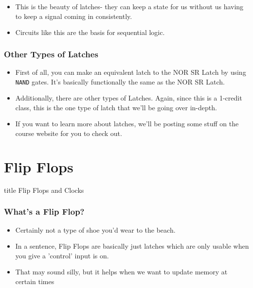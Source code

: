 \documentclass{beamer}
\begin{document}
\begin{frame}
{\begin{tikzpicture}[x=0.75pt,y=0.75pt,yscale=-1,xscale=1]
\end{tikzpicture}

   			}
   			
   			\begin{itemize}
   				\item This is the beauty of latches- they can keep a state for us without us having to keep a signal coming in consistently.
   				\item Circuits like this are the basis for sequential logic.
   			\end{itemize}
   			
   			
   		\end{frame}
   		
   		\begin{frame}
   			\frametitle{Other Types of Latches}
   			\begin{itemize}
   				\item First of all, you can make an equivalent latch to the NOR SR Latch by using \texttt{NAND} gates. It's basically functionally the same as the NOR SR Latch.
   				\item Additionally, there are other types of Latches. Again, since this is a 1-credit class, this is the one type of latch that we'll be going over in-depth.
   				\item If you want to learn more about latches, we'll be posting some stuff on the course website for you to check out.
   			\end{itemize}
   		\end{frame}
   		
   	\section{Flip Flops}
   	
   	\begin{frame}
                \vfill
                \centering
                \begin{beamercolorbox}[sep=8pt,center,shadow=true,rounded=true]{title}
                    Flip Flops and Clocks\par%
                \end{beamercolorbox}
                \vfill
             \end{frame}
   	
   		\begin{frame}
   			\frametitle{What's a Flip Flop?}
   			\begin{itemize}
   				\item Certainly not a type of shoe you'd wear to the beach.
   				\item In a sentence, Flip Flops are basically just latches which are only usable when you give a 'control' input is on.
   				\item That may sound silly, but it helps when we want to update memory at certain times
   			\end{itemize}
   		\end{frame}
   		
\end{document}
